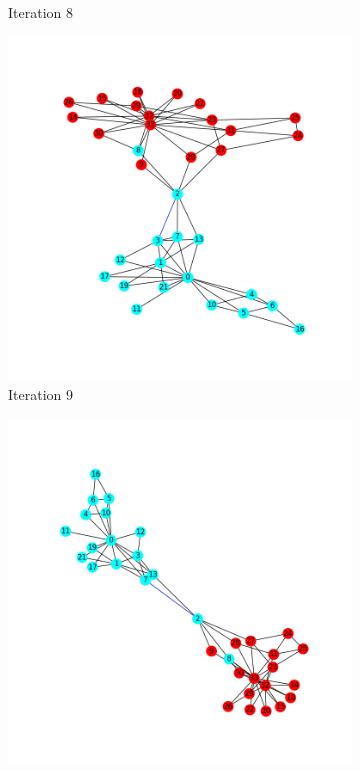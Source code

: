 \documentclass[11pt]{article} %
\begin{document}
\begin{figure}[h!]
\begin{subfigure}[b]{0.4\linewidth}
    \caption{Iteration 8}
  \end{subfigure}
  \begin{subfigure}[b]{0.4\linewidth}
    \includegraphics[width=\linewidth]{../Figures/Iteration9.png}
    \caption{Iteration 9}
  \end{subfigure}
  \begin{subfigure}[b]{0.4\linewidth}
    \includegraphics[width=\linewidth]{../Figures/Iteration10.png}

\end{subfigure}
\end{figure}
\end{document}
